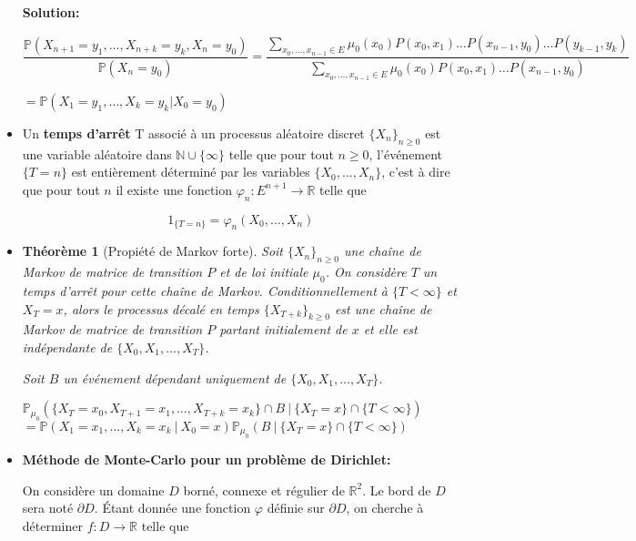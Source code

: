 \documentclass[10pt,a4paper,oneside]{article}
\newtheorem{theoreme}{Théorème}
\begin{document}
\begin{itemize}
\textbf{Solution:}

$\dfrac{ \mathbb{P}(X_{n + 1} = y_1,\ldots,X_{n + k} = y_k , X_n = y_0) }{ \mathbb{P}(X_n = y_0) } = \dfrac{ \sum_{x_0,\ldots,x_{n - 1} \in E} \mu_0(x_0)P(x_0,x_1) \ldots P(x_{n - 1},y_0) \ldots P(y_{k - 1},y_k) }{ \sum_{x_0,\ldots,x_{n - 1} \in E} \mu_0(x_0)P(x_0,x_1) \ldots P(x_{n - 1},y_0) }$

$= \mathbb{P}(X_1 = y_1,\ldots,X_k = y_k | X_0 = y_0)$

\item
Un \textbf{temps d'arrêt} T associé à un processus aléatoire discret $\{ X_n \}_{n \geq 0}$ est une variable aléatoire dans $\mathbb{N} \cup \{ \infty \}$ telle que pour tout $n \geq 0$, l'événement $\{ T = n \}$ est entièrement déterminé par les variables $\{ X_0,\ldots,X_n \}$, c'est à dire que pour tout $n$ il existe une fonction $\varphi_n : E^{n + 1} \to \mathbb{R}$ telle que

\[ 1_{ \{ T = n \} } = \varphi_n(X_0,\ldots,X_n) \]

\item
\begin{theoreme}[Propiété de Markov forte]
Soit $\{ X_n \}_{n \geq 0}$ une chaîne de Markov de matrice de transition $P$ et de loi initiale $\mu_0$. On considère $T$ un temps d'arrêt pour cette chaîne de Markov. Conditionnellement à $\{ T < \infty \}$ et $X_T = x$, alors le processus décalé en temps $\{ X_{T + k} \}_{k \geq 0}$ est une chaîne de Markov de matrice de transition $P$ partant initialement de $x$ et elle est indépendante de $\{ X_0,X_1,\ldots,X_T \}$.

Soit $B$ un événement dépendant uniquement de $\{ X_0,X_1,\ldots,X_T \}$.

\begin{center}
$\mathbb{P}_{\mu_0}(\{ X_T = x_0,X_{T + 1} = x_1,\ldots,X_{T + k} = x_k \} \cap B\ |\ \{X_T = x\} \cap \{T < \infty\})$
$= \mathbb{P}(X_1 = x_1,\ldots,X_k = x_k\ |\ X_0 = x) \mathbb{P}_{\mu_0}(B\ |\ \{X_T = x\} \cap \{T < \infty\})$
\end{center}
\end{theoreme}

\item
\textbf{Méthode de Monte-Carlo pour un problème de Dirichlet:}

On considère un domaine $D$ borné, connexe et régulier de $\mathbb{R}^2$. Le bord de $D$ sera noté $\partial D$. Étant donnée une fonction $\varphi$ définie sur $\partial D$, on cherche à déterminer $f : D \to \mathbb{R}$ telle que


\end{itemize}
\end{document}
